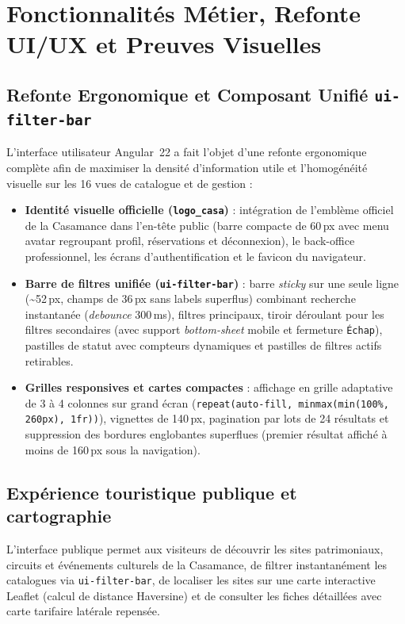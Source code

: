 \documentclass[12pt,a4paper]{report}
\begin{document}
\chapter{Fonctionnalités Métier, Refonte UI/UX et Preuves Visuelles}

\section{Refonte Ergonomique et Composant Unifié \texttt{ui-filter-bar}}
L'interface utilisateur Angular~22 a fait l'objet d'une refonte ergonomique complète afin de maximiser la densité d'information utile et l'homogénéité visuelle sur les 16 vues de catalogue et de gestion :
\begin{itemize}
    \item \textbf{Identité visuelle officielle (\texttt{logo\_casa})} : intégration de l'emblème officiel de la Casamance dans l'en-tête public (barre compacte de 60\,px avec menu avatar regroupant profil, réservations et déconnexion), le back-office professionnel, les écrans d'authentification et le favicon du navigateur.
    \item \textbf{Barre de filtres unifiée (\texttt{ui-filter-bar})} : barre \emph{sticky} sur une seule ligne (\textasciitilde 52\,px, champs de 36\,px sans labels superflus) combinant recherche instantanée (\emph{debounce} 300\,ms), filtres principaux, tiroir déroulant pour les filtres secondaires (avec support \emph{bottom-sheet} mobile et fermeture \texttt{Échap}), pastilles de statut avec compteurs dynamiques et pastilles de filtres actifs retirables.
    \item \textbf{Grilles responsives et cartes compactes} : affichage en grille adaptative de 3 à 4 colonnes sur grand écran (\texttt{repeat(auto-fill, minmax(min(100\%, 260px), 1fr))}), vignettes de 140\,px, pagination par lots de 24 résultats et suppression des bordures englobantes superflues (premier résultat affiché à moins de 160\,px sous la navigation).
\end{itemize}

\section{Expérience touristique publique et cartographie}
L'interface publique permet aux visiteurs de découvrir les sites patrimoniaux, circuits et événements culturels de la Casamance, de filtrer instantanément les catalogues via \texttt{ui-filter-bar}, de localiser les sites sur une carte interactive Leaflet (calcul de distance Haversine) et de consulter les fiches détaillées avec carte tarifaire latérale repensée.
\end{document}

